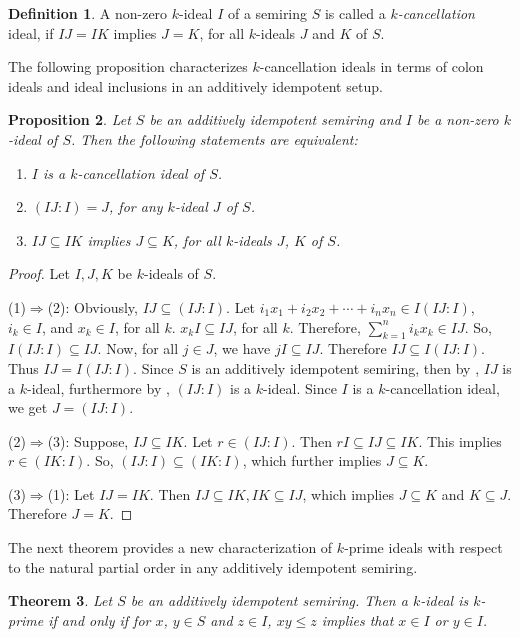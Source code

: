 \documentclass[11pt,english]{amsart}
\newtheorem{theorem}{Theorem}[section]
\newtheorem{proposition}[theorem]{Proposition}
\theoremstyle{definition}
\newtheorem{definition}[theorem]{Definition}
\numberwithin{equation}{section}
\begin{document}
\begin{definition}
A non-zero $k$-ideal $I$ of a semiring $S$ is called a \emph{$k$-cancellation} ideal,
if $IJ = IK$ implies $J = K$, for all $k$-ideals $J$ and $K$ of $S$.
\end{definition}
The following proposition characterizes $k$-cancellation ideals in terms of colon ideals and ideal inclusions in an additively idempotent setup. 
\begin{proposition}
Let $S$ be an additively idempotent semiring and $I$ be a non-zero $k$-ideal of $S$. Then the following statements are equivalent:
\begin{enumerate}
\item $I$ is a $k$-cancellation ideal of $S$.

\item $(IJ : I)=J$, for any $k$-ideal $J$ of $S$.

\item $IJ\subseteq IK$ implies $J\subseteq K$, for all $k$-ideals $J$, $K$ of $S$.
\end{enumerate}
\end{proposition}

\begin{proof}
Let $I,J,K$ be $k$-ideals of $S$.

(1)$\Rightarrow$(2): 
Obviously, $IJ\subseteq (IJ:I)$. Let $i_1x_1+i_2x_2+\cdots + i_nx_n\in I(IJ:I)$, $i_k\in I$, and $x_k\in I$, for all $k$. $x_kI\subseteq IJ$, for all $k$. Therefore, $\sum_{k=1}^n i_kx_k\in IJ$. So, $I(IJ:I)\subseteq IJ$. Now, for all $j\in J$, we have $jI\subseteq IJ$. Therefore $IJ\subseteq I(IJ:I)$. Thus $IJ=I(IJ:I)$. Since $S$ is an additively idempotent semiring, then by \cite[Lemma 3.27]{JunRayTolliver22}, $IJ$ is a $k$-ideal, furthermore by \cite[Proposition 2.4]{GoswamiDube24}, $(IJ:I)$ is a $k$-ideal.  Since $I$ is a $k$-cancellation ideal, we get $J=(IJ:I)$.

(2)$\Rightarrow$(3): 
Suppose, $IJ\subseteq IK$. Let $r\in (IJ:I)$. Then $rI\subseteq IJ\subseteq IK$. This implies $r\in (IK:I)$. So, $(IJ:I)\subseteq (IK:I)$, which further implies $J\subseteq K$.

(3)$\Rightarrow$(1):
Let $IJ=IK$. Then $IJ\subseteq IK, IK\subseteq IJ$, which implies $J\subseteq K $ and $K\subseteq J$. Therefore $J=K$.
\end{proof}
The next theorem provides a new characterization of $k$-prime ideals with respect to the natural partial order in any additively idempotent semiring.
\begin{theorem}\label{k-prime via natural partial order}
    Let $S$ be an additively idempotent semiring. Then a $k$-ideal is $k$-prime if and only if for $x$, $y \in S$ and $z \in I$, $xy \leqslant z$ implies that $x \in I$ or $y \in I$.
\end{theorem}
\end{document}
